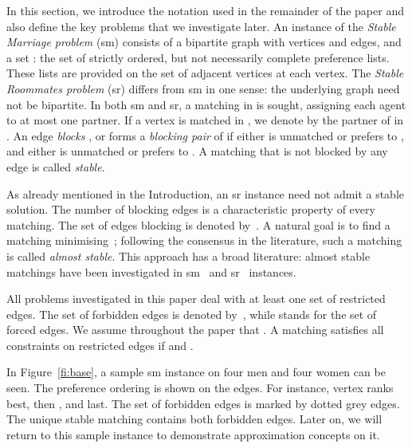 \documentclass[preprint,12pt]{elsarticle}
\begin{document}
In this section, we introduce the notation used in the remainder of the paper and also define the key problems that we investigate later. An instance  of the \emph{Stable Marriage problem} ({\sc sm}) consists of a bipartite graph  with  vertices and  edges, and a set : the set of strictly ordered, but not necessarily complete preference lists. These lists are provided on the set of adjacent vertices at each vertex. The \emph{Stable Roommates problem} ({\sc sr}) differs from {\sc sm} in one sense: the underlying graph  need not be bipartite. In both {\sc sm} and {\sc sr}, a matching  in  is sought, assigning each agent to at most one partner. If a vertex  is matched in , we denote by  the partner of  in .  An edge  \emph{blocks} , or forms a \emph{blocking pair} of  if either  is unmatched or prefers  to , and either  is unmatched or prefers  to . A matching that is not blocked by any edge is called \emph{stable}.

As already mentioned in the Introduction, an {\sc sr} instance need not admit a stable solution. The number of blocking edges is a characteristic property of every matching. The set of edges blocking  is denoted by~. A natural goal is to find a matching minimising~;
following the consensus in the literature, such a matching is called \emph{almost stable}. This approach has a broad literature: almost stable matchings have been investigated in {\sc sm}~\cite{KMV94,HIM09,BMM10} and {\sc sr}~\cite{ABM06,BMM12} instances.

All problems investigated in this paper deal with at least one set of restricted edges. The set of forbidden edges is denoted by~, while  stands for the set of forced edges. We assume throughout the paper that . A matching  satisfies all constraints on restricted edges if  and .

In Figure~\ref{fi:base}, a sample {\sc sm} instance on four men and four women can be seen. The preference ordering is shown on the edges. For instance, vertex  ranks  best, then , and  last. The set of forbidden edges  is marked by dotted grey edges. The unique stable matching  contains both forbidden edges. Later on, we will return to this sample instance to demonstrate approximation concepts on it.
\end{document}
